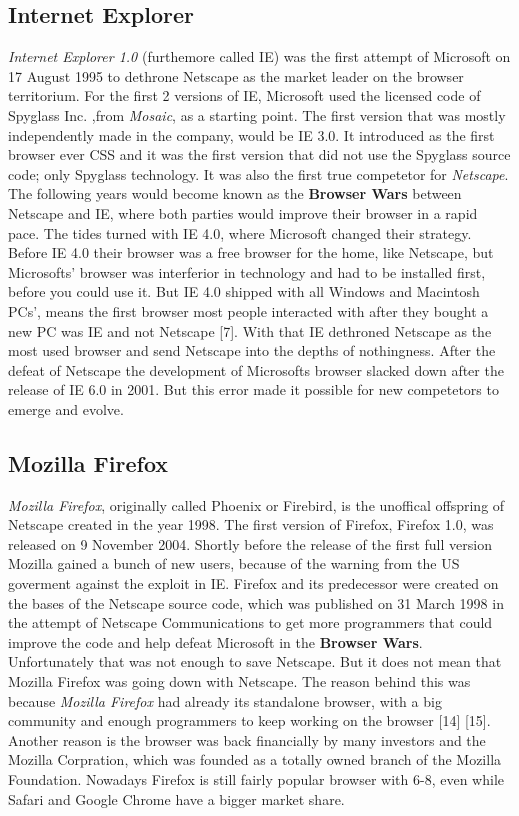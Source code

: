 \documentclass[runningheads]{llncs}
\begin{document}
		\subsection{Internet Explorer}
		\textit{Internet Explorer 1.0} (furthemore called IE) was the first attempt of Microsoft on 17 August 1995 to dethrone Netscape as the market leader on the browser territorium. For the first 2 versions of IE, Microsoft used the licensed code of Spyglass Inc. ,from \textit{Mosaic}, as a starting point. The first version that was mostly independently made in the company, would be IE 3.0. It introduced as the first browser ever CSS and it was the first version that did not use the Spyglass source code; only Spyglass technology. It was also the first true competetor for \textit{Netscape}. The following years would become known as the \textbf{Browser Wars} between Netscape and IE, where both parties would improve their browser in a rapid pace. The tides turned with IE 4.0, where Microsoft changed their strategy. Before IE 4.0 their browser was a free browser for the home, like Netscape, but Microsofts' browser was interferior in technology and had to be installed first, before you could use it. But IE 4.0 shipped with all Windows and Macintosh PCs', means the first browser most people interacted with after they bought a new PC was IE and not Netscape [7]. With that IE dethroned Netscape as the most used browser and send Netscape into the depths of nothingness. After the defeat of Netscape the development of Microsofts browser slacked down after the release of IE 6.0 in 2001. But this error made it possible for new competetors to emerge and evolve.
		\subsection{Mozilla Firefox}
		\textit{Mozilla Firefox}, originally called Phoenix or Firebird, is the unoffical offspring of Netscape created in the year 1998. The first version of Firefox, Firefox 1.0, was released on 9 November 2004. Shortly before the release of the first full version Mozilla gained a bunch of new users, because of the warning from the US goverment against the exploit in IE. Firefox and its predecessor were created on the bases of the Netscape source code, which was published on 31 March 1998 in the attempt of Netscape Communications to get more programmers that could improve the code and help defeat Microsoft in the \textbf{Browser Wars}. Unfortunately that was not enough to save Netscape. But it does not mean that Mozilla Firefox was going down with Netscape. The reason behind this was because \textit{Mozilla Firefox} had already its standalone browser, with a big community and enough  programmers  to keep working on the browser [14] [15]. Another reason is the browser was back financially by many investors and the Mozilla Corpration, which was founded as a totally owned branch of the Mozilla Foundation. Nowadays Firefox is still fairly popular browser with 6-8, even while Safari and Google Chrome have a bigger market share.
\end{document}
